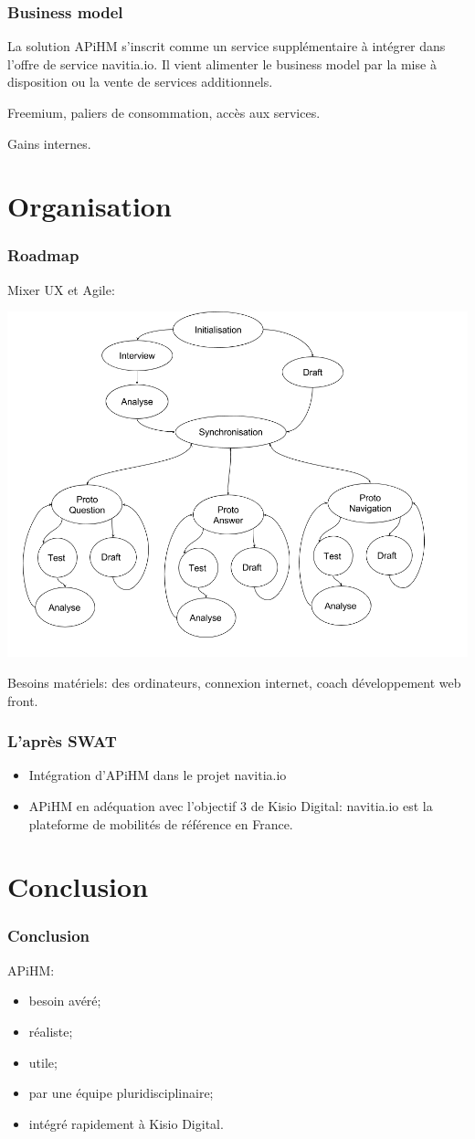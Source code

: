 \documentclass[table]{beamer}
\begin{document}
\begin{frame}
  \frametitle{Business model}

  La solution APiHM s'inscrit comme un service supplémentaire à
  intégrer dans l'offre de service navitia.io. Il vient alimenter le
  business model par la mise à disposition ou la vente de services
  additionnels.

  Freemium, paliers de consommation, accès aux services.

  Gains internes.
\end{frame}

\section{Organisation}

\begin{frame}
  \frametitle{Roadmap}

  Mixer UX et Agile:

  {\centering\includegraphics[width=0.7\linewidth]{images/roadmap}

  }

  Besoins matériels: des ordinateurs, connexion internet, coach
  développement web front.
\end{frame}

\begin{frame}
  \frametitle{L'après SWAT}

  \begin{itemize}
  \item Intégration d'APiHM dans le projet navitia.io
  \item APiHM en adéquation avec l'objectif 3 de Kisio Digital:
    navitia.io est la plateforme de mobilités de référence en France.
  \end{itemize}
\end{frame}

\section{Conclusion}

\begin{frame}
  \frametitle{Conclusion}

  APiHM:
  \begin{itemize}
  \item besoin avéré;
  \item réaliste;
  \item utile;
  \item par une équipe pluridisciplinaire;
  \item intégré rapidement à Kisio Digital.
  \end{itemize}
\end{frame}

\begin{frame}
  \titlepage
\end{frame}
\end{document}
